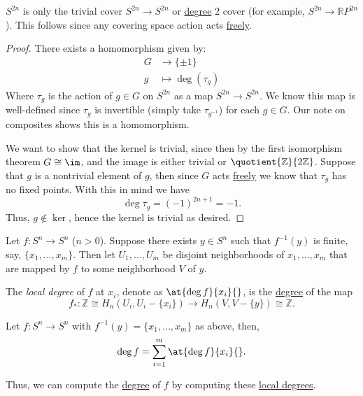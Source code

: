 \begin{corollary}
	\(S^{2n}\) is only the trivial cover \(S^{2n} \to S^{2n}\) or \hyperref[def:degree]{degree} \(2\) cover (for example, \(S^{2n} \to \mathbb{R}P^{2n}\)).
	This follows since any covering space action acts \hyperref[def:free-group]{freely}.
\end{corollary}

\begin{proof}
	There exists a homomorphism given by:
	\[
		\begin{split}
			G & \to \{\pm 1\}        \\
			g & \mapsto \deg(\tau_g)
		\end{split}
	\]
	Where \(\tau_g\) is the action of \(g \in G\) on \(S^{2n}\) as a map \(S^{2n} \to S^{2n}\). We know this map is well-defined since \(\tau_g\) is invertible
	(simply take \(\tau_{g^{-1}}\)) for each \(g \in G\). Our note on composites shows this is a homomorphism.

	We want to show that the kernel is trivial, since then by the first isomorphism theorem \(G \cong \im\), and the image is either trivial or
	\(\quotient{\mathbb{Z}}{2\mathbb{Z}}\). Suppose that \(g\) is a nontrivial element of \(g\), then since \(G\) acts \hyperref[def:free-group]{freely} we know that
	\(\tau_g\) has no fixed points. With this in mind we have
	\[
		\deg \tau_g = (-1)^{2n + 1} = - 1.
	\]
	Thus, \(g \not\in \ker\), hence the kernel is trivial as desired.
\end{proof}

\begin{definition}\label{def:local-degree}
	Let \(f \colon S^n \to S^n\) (\(n > 0\)). Suppose there exists \(y \in S^n\) such that \(f^{-1}(y)\) is finite, say, \(\{x_1, \ldots, x_m\}\).
	Then let \(U_1, \ldots, U_m\) be disjoint neighborhoods of \(x_1, \ldots, x_m\) that are mapped by \(f\) to some neighborhood \(V\) of \(y\).
	\begin{figure}[H]
		\centering
		\label{fig:def:local-degree}
	\end{figure}

	The \emph{local degree} of \(f\) at \(x_i\), denote as \(\at{\deg f}{x_i}{}\), is the \hyperref[def:degree]{degree} of the map
	\[
		f_\ast \colon \mathbb{Z} \cong H_n(U_i, U_i - \{x_i\}) \to H_n(V, V - \{y\}) \cong \mathbb{Z}.
	\]
\end{definition}

\begin{theorem}\label{thm-calculation-with-local-degree}
	Let \(f \colon  S^n \to S^n\) with \(f^{-1}(y) = \{x_1, \ldots, x_m\}\) as above, then,
	\[
		\deg f = \sum_{i = 1}^m \at{\deg f}{x_i}{}.
	\]
\end{theorem}
\begin{remark}
	Thus, we can compute the \hyperref[def:degree]{degree} of $f$ by computing these \hyperref[def:local-degree]{local degrees}.
\end{remark}